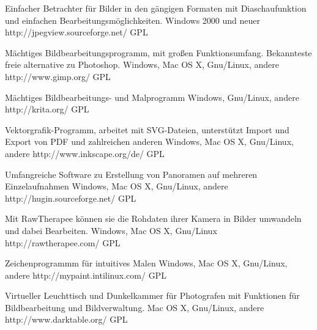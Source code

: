\documentclass[12pt,a4paper,landscape,twocolumn]{article}
\begin{document}

{Einfacher Betrachter für Bilder in den gängigen Formaten mit Diaschaufunktion und einfachen Bearbeitungsmöglichkeiten.}
{Windows 2000 und neuer}
{http://jpegview.sourceforge.net/}
{GPL}

{Mächtiges Bildbearbeitungsprogramm, mit großen Funktionsumfang. Bekannteste freie alternative zu Photoshop.}
{Windows, Mac OS X, Gnu/Linux, andere}
{http://www.gimp.org/}
{GPL}

{Mächtiges Bildbearbeitungs- und Malprogramm}
{Windows, Gnu/Linux, andere}
{http://krita.org/}
{GPL}

{Vektorgrafik-Programm, arbeitet mit SVG-Dateien, unterstützt Import und Export von PDF und zahlreichen anderen}
{Windows, Mac OS X, Gnu/Linux, andere}
{http://www.inkscape.org/de/}
{GPL}

\newpage %

{Umfangreiche Software zu Erstellung von Panoramen auf mehreren Einzelaufnahmen}
{Windows, Mac OS X, Gnu/Linux, andere}
{http://hugin.sourceforge.net/}
{GPL}

{Mit RawTherapee können sie die Rohdaten ihrer Kamera in Bilder umwandeln und dabei Bearbeiten.}
{Windows, Mac OS X, Gnu/Linux}
{http://rawtherapee.com/ }
{GPL}

{Zeichenprogrammm für intuitives Malen}
{Windows, Mac OS X, Gnu/Linux, andere}
{http://mypaint.intilinux.com/}
{GPL}

{Virtueller Leuchttisch und Dunkelkammer für Photografen mit Funktionen für Bildbearbeitung und Bildverwaltung.}
{Mac OS X, Gnu/Linux, andere}
{http://www.darktable.org/}
{GPL}
\end{document}
